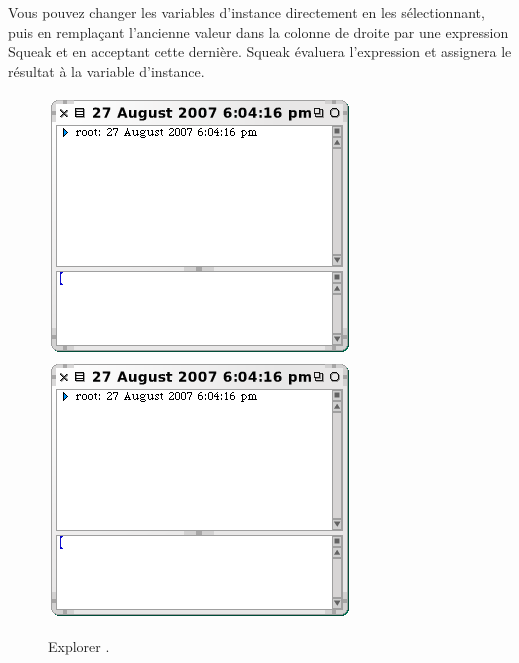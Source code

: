\documentclass[a4paper,10pt,twoside]{book}
\begin{document}
Vous pouvez changer les variables d'instance directement en les s\'electionnant,
puis en rempla\c{c}ant l'ancienne valeur dans la colonne de droite
par une expression Squeak et en acceptant cette derni\`ere.
Squeak \'evaluera l'expression et assignera le r\'esultat \`a la variable
d'instance.

\begin{figure}[tbp]
\begin{minipage}{0.48\textwidth}
	\begin{center}
	\ifluluelse
		{\includegraphics[width=\textwidth]{exploreTimeStampNow}}
		{\includegraphics[scale=0.7]{exploreTimeStampNow}}
	\end{center}
	\caption{Explorer .}
	\label{fig:exploreTimeStampNow}
\end{minipage}
\hfill
\begin{minipage}{0.48\textwidth}

\end{minipage}
\end{figure}
\end{document}
